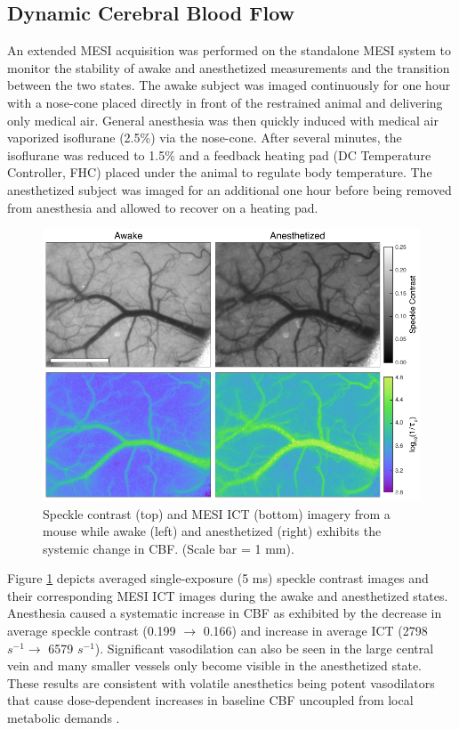 \subsection{Dynamic Cerebral Blood Flow} \label{ssec:dynamicawakecbf}

An extended MESI acquisition was performed on the standalone MESI system to monitor the stability of awake and anesthetized measurements and the transition between the two states. The awake subject was imaged continuously for one hour with a nose-cone placed directly in front of the restrained animal and delivering only medical air. General anesthesia was then quickly induced with medical air vaporized isoflurane (2.5\%) via the nose-cone. After several minutes, the isoflurane was reduced to 1.5\% and a feedback heating pad (DC Temperature Controller, FHC) placed under the animal to regulate body temperature. The anesthetized subject was imaged for an additional one hour before being removed from anesthesia and allowed to recover on a heating pad.

\begin{figure}
    \includegraphics{figures/chapter_5/speckleawakeanes.pdf}
    \caption{
        \label{fig:speckleawakeanes}
        Speckle contrast (top) and MESI ICT (bottom) imagery from a mouse while awake (left) and anesthetized (right) exhibits the systemic change in CBF. (Scale bar = 1 mm).
    }
\end{figure}

Figure \ref{fig:speckleawakeanes} depicts averaged single-exposure (5 ms) speckle contrast images and their corresponding MESI ICT images during the awake and anesthetized states. Anesthesia caused a systematic increase in CBF as exhibited by the decrease in average speckle contrast (0.199 $\to$ 0.166) and increase in average ICT (2798 $s^{-1} \to$ 6579 $s^{-1}$). Significant vasodilation can also be seen in the large central vein and many smaller vessels only become visible in the anesthetized state. These results are consistent with volatile anesthetics being potent vasodilators that cause dose-dependent increases in baseline CBF uncoupled from local metabolic demands \cite{Masamoto:2012bj}.

